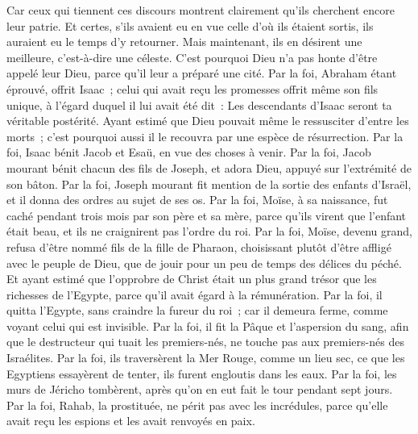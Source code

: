 \begin{multicols}{2}
Car ceux qui tiennent ces discours montrent clairement qu'ils cherchent encore leur patrie.
Et certes, s'ils avaient eu en vue celle d'où ils étaient sortis, ils auraient eu le temps d'y retourner.
Mais maintenant, ils en désirent une meilleure, c'est-à-dire une céleste. C'est pourquoi Dieu n'a pas honte d'être appelé leur Dieu, parce qu'il leur a préparé une cité.
Par la foi, Abraham étant éprouvé, offrit Isaac~; celui qui avait reçu les promesses offrit même son fils unique,
à l'égard duquel il lui avait été dit~: Les descendants d'Isaac seront ta véritable postérité.
Ayant estimé que Dieu pouvait même le ressusciter d'entre les morts~; c'est pourquoi aussi il le recouvra par une espèce de résurrection.
Par la foi, Isaac bénit Jacob et Esaü, en vue des choses à venir.
Par la foi, Jacob mourant bénit chacun des fils de Joseph, et adora Dieu, appuyé sur l'extrémité de son bâton.
Par la foi, Joseph mourant fit mention de la sortie des enfants d'Israël, et il donna des ordres au sujet de ses os.
Par la foi, Moïse, à sa naissance, fut caché pendant trois mois par son père et sa mère, parce qu'ils virent que l'enfant était beau, et ils ne craignirent pas l'ordre du roi.
Par la foi, Moïse, devenu grand, refusa d'être nommé fils de la fille de Pharaon,
choisissant plutôt d'être affligé avec le peuple de Dieu, que de jouir pour un peu de temps des délices du péché.
Et ayant estimé que l'opprobre de Christ était un plus grand trésor que les richesses de l'Egypte, parce qu'il avait égard à la rémunération.
Par la foi, il quitta l'Egypte, sans craindre la fureur du roi~; car il demeura ferme, comme voyant celui qui est invisible.
Par la foi, il fit la Pâque et l'aspersion du sang, afin que le destructeur qui tuait les premiers-nés, ne touche pas aux premiers-nés des Israélites.
Par la foi, ils traversèrent la Mer Rouge, comme un lieu sec, ce que les Egyptiens essayèrent de tenter, ils furent engloutis dans les eaux.
Par la foi, les murs de Jéricho tombèrent, après qu'on en eut fait le tour pendant sept jours.
Par la foi, Rahab, la prostituée, ne périt pas avec les incrédules, parce qu'elle avait reçu les espions et les avait renvoyés en paix.

\end{multicols}
